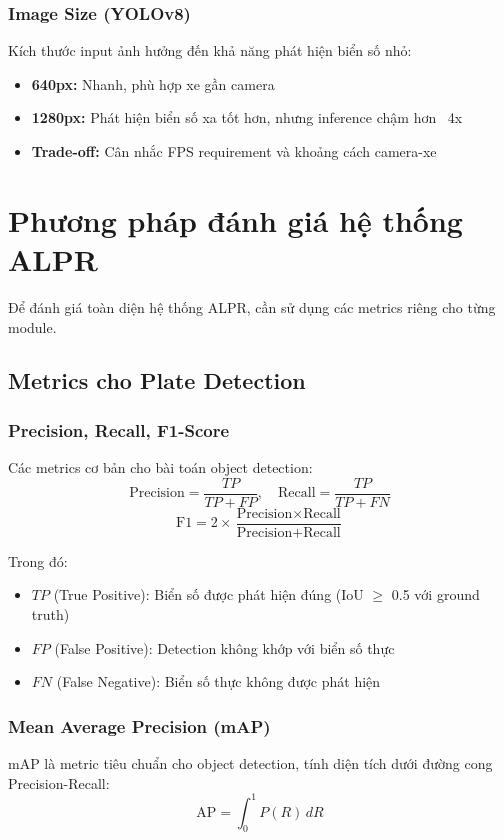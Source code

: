\subsubsection{Image Size (YOLOv8)}
Kích thước input ảnh hưởng đến khả năng phát hiện biển số nhỏ:
\begin{itemize}
    \item \textbf{640px:} Nhanh, phù hợp xe gần camera
    \item \textbf{1280px:} Phát hiện biển số xa tốt hơn, nhưng inference chậm hơn ~4x
    \item \textbf{Trade-off:} Cân nhắc FPS requirement và khoảng cách camera-xe
\end{itemize}

\section{Phương pháp đánh giá hệ thống ALPR}

Để đánh giá toàn diện hệ thống ALPR, cần sử dụng các metrics riêng cho từng module.

\subsection{Metrics cho Plate Detection}

\subsubsection{Precision, Recall, F1-Score}
Các metrics cơ bản cho bài toán object detection:
\begin{equation}
    \text{Precision} = \frac{TP}{TP + FP}, \quad \text{Recall} = \frac{TP}{TP + FN}
\end{equation}
\begin{equation}
    \text{F1} = 2 \times \frac{\text{Precision} \times \text{Recall}}{\text{Precision} + \text{Recall}}
\end{equation}

Trong đó:
\begin{itemize}
    \item $TP$ (True Positive): Biển số được phát hiện đúng (IoU $\geq$ 0.5 với ground truth)
    \item $FP$ (False Positive): Detection không khớp với biển số thực
    \item $FN$ (False Negative): Biển số thực không được phát hiện
\end{itemize}

\subsubsection{Mean Average Precision (mAP)}
mAP là metric tiêu chuẩn cho object detection, tính diện tích dưới đường cong Precision-Recall:
\begin{equation}
    \text{AP} = \int_0^1 P(R) \, dR
\end{equation}

